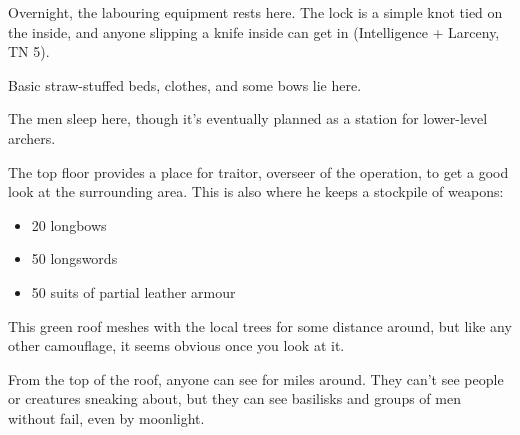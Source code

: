\begin{multicols}{2}


Overnight, the labouring equipment rests here.
The lock is a simple knot tied on the inside, and anyone slipping a knife inside can get in (Intelligence + Larceny, TN 5).


Basic straw-stuffed beds, clothes, and some bows lie here.


The men sleep here, though it's eventually planned as a station for lower-level archers.


The top floor provides a place for \gls{traitor}, overseer of the operation, to get a good look at the surrounding area.
This is also where he keeps a stockpile of weapons:

\begin{itemize}

  \item{20 longbows}
  \item{50 longswords}
  \item{50 suits of partial leather armour}

\end{itemize}


This green roof meshes with the local trees for some distance around, but like any other camouflage, it seems obvious once you look at it.

From the top of the roof, anyone can see for miles around.
They can't see people or creatures sneaking about, but they can see basilisks and groups of men without fail, even by moonlight.




\end{multicols}

